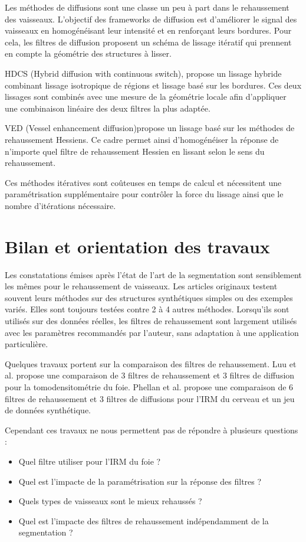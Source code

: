 Les méthodes de diffusions sont une classe un peu à part dans le rehaussement des vaisseaux. L'objectif des frameworks de diffusion est d'améliorer le signal des vaisseaux en homogénéisant leur intensité et en renforçant leurs bordures. Pour cela, les filtres de diffusion proposent un schéma de lissage itératif qui prennent en compte la géométrie des structures à lisser.

HDCS \cite{Mendrik2009_HDCS} (Hybrid diffusion with continuous switch), propose un lissage hybride combinant lissage isotropique de régions et lissage basé sur les bordures. Ces deux lissages sont combinés avec une mesure de la géométrie locale afin d'appliquer une combinaison linéaire des deux filtres la plus adaptée.

VED \cite{Manniesing2006_VED} (Vessel enhancement diffusion)propose un lissage basé sur les méthodes de rehaussement Hessiens. Ce cadre permet ainsi d'homogénéiser la réponse de n'importe quel filtre de rehaussement Hessien en lissant selon le sens du rehaussement.

Ces méthodes itératives sont coûteuses en temps de calcul et nécessitent une paramétrisation supplémentaire pour contrôler la force du lissage ainsi que le nombre d'itérations nécessaire.

\section{Bilan et orientation des travaux}
\label{sec:EA:bilan}

Les constatations émises après l'état de l'art de la segmentation sont sensiblement les mêmes pour le rehaussement de vaisseaux. Les articles originaux testent souvent leurs méthodes sur des structures synthétiques simples ou des exemples variés. Elles sont toujours testées contre 2 à 4 autres méthodes. Lorsqu'ils sont utilisés sur des données réelles, les filtres de rehaussement sont largement utilisés avec les paramètres recommandés par l'auteur, sans adaptation à une application particulière.

Quelques travaux portent sur la comparaison des filtres de rehaussement. Luu et al. \cite{Luu2015_liver_vesselness_comparison} propose une comparaison de 3 filtres de rehaussement et 3 filtres de diffusion pour la tomodensitométrie du foie. Phellan et al. \cite{Phellan2017_Brain_vesselness_comparison} propose une comparaison de 6 filtres de rehaussement et 3 filtres de diffusions pour l'IRM du cerveau et un jeu de données synthétique.

Cependant ces travaux ne nous permettent pas de répondre à plusieurs questions :

\begin{itemize}
\item Quel filtre utiliser pour l'IRM du foie ?
\item Quel est l'impacte de la paramétrisation sur la réponse des filtres ?
\item Quels types de vaisseaux sont le mieux rehaussés ?
\item Quel est l'impacte des filtres de rehaussement indépendamment de la segmentation ?
\end{itemize}